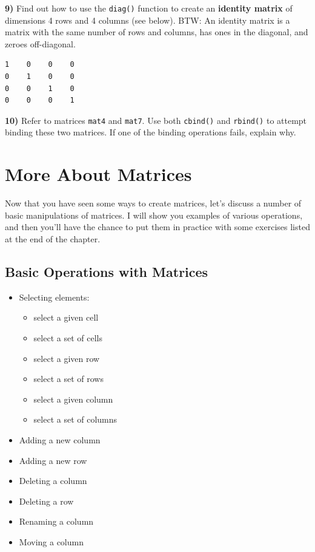 \documentclass[
]{book}
\providecommand{\tightlist}{%
  \setlength{\itemsep}{0pt}\setlength{\parskip}{0pt}}
\begin{document}
\textbf{9)} Find out how to use the \texttt{diag()} function to create an \textbf{identity matrix}
of dimensions 4 rows and 4 columns (see below). BTW: An identity matrix is a
matrix with the same number of rows and columns, has ones in the diagonal,
and zeroes off-diagonal.

\begin{verbatim}
1    0    0    0
0    1    0    0
0    0    1    0
0    0    0    1
\end{verbatim}

\textbf{10)} Refer to matrices \texttt{mat4} and \texttt{mat7}. Use both \texttt{cbind()} and \texttt{rbind()}
to attempt binding these two matrices. If one of the binding operations fails,
explain why.

\hypertarget{matrices2}{%
\chapter{More About Matrices}\label{matrices2}}

Now that you have seen some ways to create matrices, let's discuss a number
of basic manipulations of matrices. I will show you examples of various
operations, and then you'll have the chance to put them in practice with some
exercises listed at the end of the chapter.

\hypertarget{basic-operations-with-matrices}{%
\section{Basic Operations with Matrices}\label{basic-operations-with-matrices}}

\begin{itemize}
\tightlist
\item
  Selecting elements:

  \begin{itemize}
  \tightlist
  \item
    select a given cell
  \item
    select a set of cells
  \item
    select a given row
  \item
    select a set of rows
  \item
    select a given column
  \item
    select a set of columns
  \end{itemize}
\item
  Adding a new column
\item
  Adding a new row
\item
  Deleting a column
\item
  Deleting a row
\item
  Renaming a column
\item
  Moving a column
\end{itemize}
\end{document}
